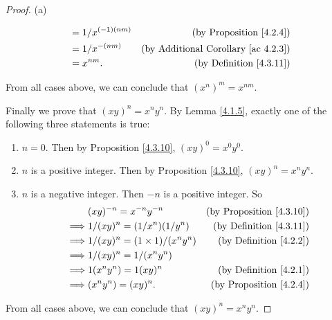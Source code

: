 \begin{proof}{(a)}
\begin{enumerate}[label=(\Roman*)]
\begin{enumerate}[label=(\roman*)]
\begin{align*}
                             & = 1 / x^{(-1)(nm)} & \text{(by Proposition \ref{4.2.4})}             \\
                             & = 1 / x^{-(nm)}    & \text{(by Additional Corollary \ref{ac 4.2.3})} \\
                             & = x^{nm}.          & \text{(by Definition \ref{4.3.11})}
                        \end{align*}
              \end{enumerate}
    \end{enumerate}
    From all cases above, we can conclude that \((x^n)^m = x^{nm}\).

    Finally we prove that \((xy)^n = x^n y^n\).
    By Lemma \ref{4.1.5}, exactly one of the following three statements is true:
    \begin{enumerate}[label=(\roman*)]
        \item \(n = 0\).
              Then by Proposition \ref{4.3.10}, \((xy)^0 = x^0 y^0\).
        \item \(n\) is a positive integer.
              Then by Proposition \ref{4.3.10}, \((xy)^n = x^n y^n\).
        \item \(n\) is a negative integer.
              Then \(-n\) is a positive integer.
              So
              \begin{align*}
                           & (xy)^{-n} = x^{-n} y^{-n}             & \text{(by Proposition \ref{4.3.10})} \\
                  \implies & 1 / (xy)^n = (1 / x^n)(1 / y^n)       & \text{(by Definition \ref{4.3.11})}  \\
                  \implies & 1 / (xy)^n = (1 \times 1) / (x^n y^n) & \text{(by Definition \ref{4.2.2})}   \\
                  \implies & 1 / (xy)^n = 1 / (x^n y^n)                                                   \\
                  \implies & 1(x^n y^n) = 1(xy)^n                  & \text{(by Definition \ref{4.2.1})}   \\
                  \implies & (x^n y^n) = (xy)^n.                   & \text{(by Proposition \ref{4.2.4})}
              \end{align*}
    \end{enumerate}
    From all cases above, we can conclude that \((xy)^n = x^n y^n\).
\end{proof}

